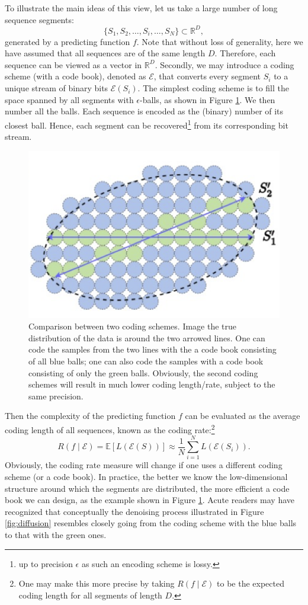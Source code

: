 \documentclass[../../book-main.tex]{subfiles}
\begin{document}
To illustrate the main ideas of this view, let us take a large number of long sequence segments:
\begin{equation}
    \{S_1, S_2, \ldots, S_i, \ldots, S_N\} \subset \mathbb{R}^D,
\end{equation}
generated by a predicting function $f$. Note that without loss of generality, here we have assumed that all sequences are of the same length $D$. Therefore, each sequence can be viewed as a vector in $\mathbb{R}^D$. Secondly, we may introduce a coding scheme (with a code book), denoted as $\mathcal E$, that converts every segment $S_i$ to a unique stream of binary bits $\mathcal{E}(S_i)$. The simplest coding scheme is to fill the space spanned by all segments with $\epsilon$-balls, as shown in Figure \ref{fig:coding-schemes}. We then number all the balls. Each sequence is encoded as the (binary) number of its closest ball. Hence, each segment can be recovered\footnote{up to precision $\epsilon$ as such an encoding scheme is lossy.} from its corresponding bit stream. 
\begin{figure}
    \centering
    \includegraphics[width=0.5\linewidth]{figures/Coding-schemes.png}
    \caption{Comparison between two coding schemes. Image the true distribution of the data is around the two arrowed lines. One can code the samples from the two lines with the a code book consisting of all blue balls; one can also code the samples with a code book consisting of only the green balls. Obviously, the second coding schemes will result in much lower coding length/rate, subject to the same precision.}
    \label{fig:coding-schemes}
\end{figure}


Then the complexity of the predicting function $f$ can be evaluated as the average coding length of all sequences, known as the coding rate:\footnote{One may make this more precise by taking $R(f\mid \mathcal{E})$ to be the expected coding length for all segments of length $D$. }
\begin{equation}
   R(f \mid \mathcal E) = \mathbb{E}[L(\mathcal{E}(S))] \approx \frac{1}{N}\sum_{i=1}^N L(\mathcal{E}(S_i)). 
   \label{eqn:coding-rate}
\end{equation}
Obviously, the coding rate measure will change if one uses a different coding  scheme (or a code book). In practice, the better we know the low-dimensional structure around which the segments are distributed, the more efficient a code book we can design, as the example shown in Figure \ref{fig:coding-schemes}. Acute readers may have recognized that conceptually the denoising process illustrated in Figure \ref{fig:diffusion} resembles closely going from the coding scheme with the blue balls to that with the green ones.
\end{document}
